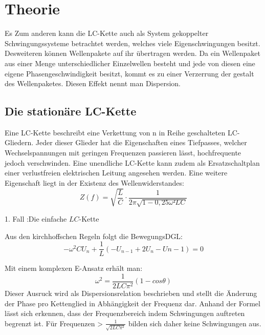 
\section{Theorie}
\label{sec:Theorie}

 Es  Zum anderen kann die LC-Kette auch als System gekoppelter
    Schwingungssysteme betrachtet werden, welches viele Eigenschwingungen besitzt.
     Desweiteren können Wellenpakete auf ihr übertragen werden.
     Da ein Wellenpaket aus einer Menge unterschiedlicher Einzelwellen besteht
      und jede von diesen eine eigene Phasengeschwindigkeit besitzt, kommt es zu einer Verzerrung
  der gestalt des Wellenpaketes. Diesen Effekt nennt man Dispersion.

\subsection{Die stationäre LC-Kette}
Eine LC-Kette beschreibt eine Verkettung von n in Reihe geschalteten LC-Gliedern.
 Jeder dieser Glieder hat die Eigenschaften eines Tiefpasses, welcher
  Wechselspannungen mit geringen Frequenzen passieren lässt, hochfrequente jedoch
   verschwinden. Eine unendliche LC-Kette kann zudem als Ersatzschaltplan einer
    verlustfreien elektrischen Leitung angesehen werden. Eine weitere Eigenschaft
     liegt in der Existenz des Wellenwiderstandes:
     \begin{equation}
       Z(f) = \sqrt{\frac{L}{C}} \cdot \frac{1}{2\pi \sqrt{1-0,25\omega² LC}}
     \end{equation}

1. Fall :Die einfache $LC$-Kette

Aus den kirchhoffschen Regeln folgt die BewegungsDGL:
\begin{equation}
- \omega ^2 C U_n + \frac{1}{L} \left( -U_{n-1} + 2U_ n -U{n-1} \right) = 0
\end{equation}

Mit einem komplexen E-Ansatz erhält man:
\begin{equation}
\omega ^2 = \frac{1}{2LC\pi^2}(1-cos\theta)
\end{equation}
Dieser Ausruck wird als Dispersionsrelation beschrieben und stellt die Änderung
 der Phase pro Kettenglied in Abhängigkeit der Frequenz dar. Anhand der Formel lässt sich erkennen,
  dass der Frequenzbereich indem Schwingungen auftreten begrenzt ist. Für Frequenzen >
 $\frac{1}{\sqrt{2LC\pi^2}}$ bilden sich daher keine Schwingungen aus.\\\\

